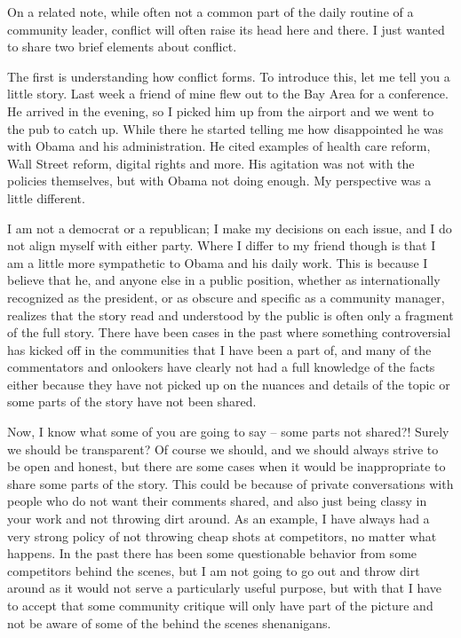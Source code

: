 On a related note, while often not a common part of the daily routine of a
community leader, conflict will often raise its head here and there. I just
wanted to share two brief elements about conflict.

The first is understanding how conflict forms. To introduce this, let me tell
you a little story. Last week a friend of mine flew out to the Bay Area for a
conference. He arrived in the evening, so I picked him up from the airport and
we went to the pub to catch up. While there he started telling me how
disappointed he was with Obama and his administration. He cited examples of
health care reform, Wall Street reform, digital rights and more. His agitation
was not with the policies themselves, but with Obama not doing enough. My
perspective was a little different.

I am not a democrat or a republican; I make my decisions on each issue, and I do
not align myself with either party. Where I differ to my friend though is that I
am a little more sympathetic to Obama and his daily work. This is because I
believe that he, and anyone else in a public position, whether as
internationally recognized as the president, or as obscure and specific as a
community manager, realizes that the story read and understood by the public is
often only a fragment of the full story. There have been cases in the past where
something controversial has kicked off in the communities that I have been a
part of, and many of the commentators and onlookers have clearly not had a full
knowledge of the facts either because they have not picked up on the nuances and
details of the topic or some parts of the story have not been shared.

Now, I know what some of you are going to say -- some parts not shared?! Surely
we should be transparent? Of course we should, and we should always strive to be
open and honest, but there are some cases when it would be inappropriate to
share some parts of the story. This could be because of private conversations
with people who do not want their comments shared, and also just being classy in
your work and not throwing dirt around. As an example, I have always had a very
strong policy of not throwing cheap shots at competitors, no matter what
happens. In the past there has been some questionable behavior from some
competitors behind the scenes, but I am not going to go out and throw dirt
around as it would not serve a particularly useful purpose, but with that I have
to accept that some community critique will only have part of the picture and
not be aware of some of the behind the scenes shenanigans.

